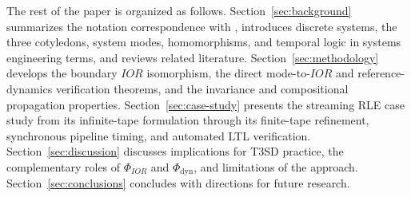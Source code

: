 The rest of the paper is organized as follows. Section~\ref{sec:background} summarizes the notation correspondence with \citet{Wymore1993}, introduces discrete systems, the three cotyledons, system modes, homomorphisms, and temporal logic in systems engineering terms, and reviews related literature. Section~\ref{sec:methodology} develops the boundary $IOR$ isomorphism, the direct mode-to-$IOR$ and reference-dynamics verification theorems, and the invariance and compositional propagation properties. Section~\ref{sec:case-study} presents the streaming RLE case study from its infinite-tape formulation through its finite-tape refinement, synchronous pipeline timing, and automated LTL verification. Section~\ref{sec:discussion} discusses implications for T3SD practice, the complementary roles of $\Phi_{IOR}$ and $\Phi_{\mathrm{dyn}}$, and limitations of the approach. Section~\ref{sec:conclusions} concludes with directions for future research.
